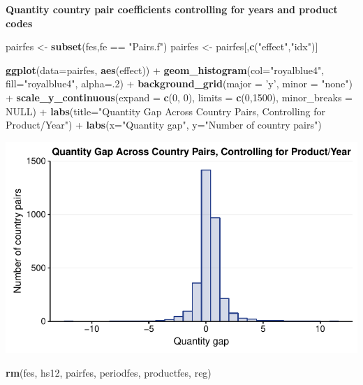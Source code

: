 \documentclass[10pt,]{article}
\newenvironment{Shaded}{\begin{snugshade}}{\end{snugshade}}
\newcommand{\KeywordTok}[1]{\textcolor[rgb]{0.13,0.29,0.53}{\textbf{{#1}}}}
\newcommand{\DataTypeTok}[1]{\textcolor[rgb]{0.13,0.29,0.53}{{#1}}}
\newcommand{\DecValTok}[1]{\textcolor[rgb]{0.00,0.00,0.81}{{#1}}}
\newcommand{\StringTok}[1]{\textcolor[rgb]{0.31,0.60,0.02}{{#1}}}
\newcommand{\OtherTok}[1]{\textcolor[rgb]{0.56,0.35,0.01}{{#1}}}
\newcommand{\NormalTok}[1]{{#1}}
\begin{document}
\textbf{Quantity country pair coefficients controlling for years and
product codes}

\begin{Shaded}
\begin{Highlighting}[]
\NormalTok{pairfes <-}\StringTok{ }\KeywordTok{subset}\NormalTok{(fes,fe ==}\StringTok{ "Pairs.f"}\NormalTok{)}
\NormalTok{pairfes <-}\StringTok{ }\NormalTok{pairfes[,}\KeywordTok{c}\NormalTok{(}\StringTok{"effect"}\NormalTok{,}\StringTok{"idx"}\NormalTok{)]}

\KeywordTok{ggplot}\NormalTok{(}\DataTypeTok{data=}\NormalTok{pairfes, }\KeywordTok{aes}\NormalTok{(effect)) +}
\StringTok{  }\KeywordTok{geom_histogram}\NormalTok{(}\DataTypeTok{col=}\StringTok{"royalblue4"}\NormalTok{,}
                 \DataTypeTok{fill=}\StringTok{"royalblue4"}\NormalTok{,}
                 \DataTypeTok{alpha=}\NormalTok{.}\DecValTok{2}\NormalTok{) +}
\StringTok{  }\KeywordTok{background_grid}\NormalTok{(}\DataTypeTok{major =} \StringTok{'y'}\NormalTok{, }\DataTypeTok{minor =} \StringTok{"none"}\NormalTok{) +}
\StringTok{  }\KeywordTok{scale_y_continuous}\NormalTok{(}\DataTypeTok{expand =} \KeywordTok{c}\NormalTok{(}\DecValTok{0}\NormalTok{, }\DecValTok{0}\NormalTok{), }\DataTypeTok{limits =} \KeywordTok{c}\NormalTok{(}\DecValTok{0}\NormalTok{,}\DecValTok{1500}\NormalTok{), }\DataTypeTok{minor_breaks =} \OtherTok{NULL}\NormalTok{) +}
\StringTok{  }\KeywordTok{labs}\NormalTok{(}\DataTypeTok{title=}\StringTok{"Quantity Gap Across Country Pairs, Controlling for Product/Year"}\NormalTok{) +}
\StringTok{  }\KeywordTok{labs}\NormalTok{(}\DataTypeTok{x=}\StringTok{"Quantity gap"}\NormalTok{, }\DataTypeTok{y=}\StringTok{"Number of country pairs"}\NormalTok{)}
\end{Highlighting}
\end{Shaded}

\begin{center}\includegraphics{Figs/quantity_pairs_reg-1} \end{center}

\begin{Shaded}
\begin{Highlighting}[]
\KeywordTok{rm}\NormalTok{(fes, hs12, pairfes, periodfes, productfes, reg)}
\end{Highlighting}
\end{Shaded}
\end{document}
